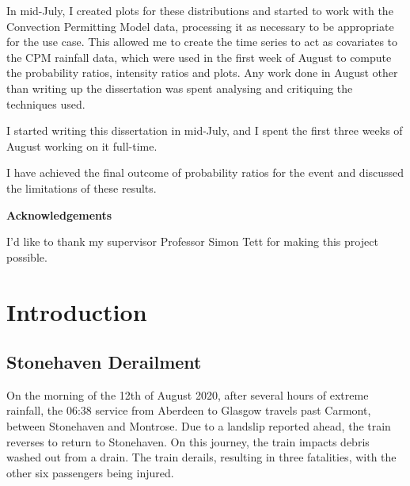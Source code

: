 \documentclass[12pt,a4paper,openany]{report}
\begin{document}
In mid-July, I created plots for these distributions and started to work with the Convection Permitting Model data,
    processing it as necessary to be appropriate for the use case.
This allowed me to create the time series to act as covariates to the CPM rainfall data,
    which were used in the first week of August to compute the probability ratios, intensity ratios and plots.
Any work done in August other than writing up the dissertation was spent analysing and critiquing the techniques used.

I started writing this dissertation in mid-July, and I spent the first
three weeks of August working on it full-time.

I have achieved the final outcome of probability ratios for the event and
    discussed the limitations of these results.


\newpage

\begin{center}
\textbf{Acknowledgements}
\end{center}

I'd like to thank my supervisor Professor Simon Tett for
making this project possible.


\newpage
\tableofcontents
\newpage
\listoftables
\newpage
\listoffigures


\chapter{Introduction}\label{ch:intro}

\section{Stonehaven Derailment}\label{sec:stonederail}

On the morning of the 12th of August 2020,
    after several hours of extreme rainfall,
    the 06:38 service from Aberdeen to Glasgow travels past Carmont,
    between Stonehaven and Montrose.
Due to a landslip reported ahead,
    the train reverses to return to Stonehaven.
On this journey,
    the train impacts debris washed out from a drain.
The train derails,
    resulting in three fatalities,
    with the other six passengers being injured.
\end{document}
